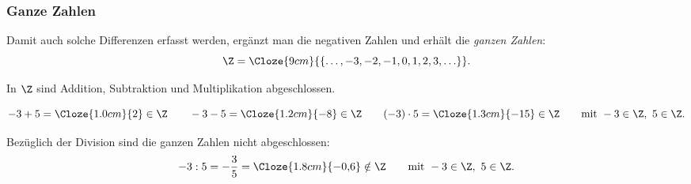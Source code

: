 \subsubsection{Ganze Zahlen}
\label{subsubsec:fundamentals_integer_numbers}

Damit auch solche Differenzen erfasst werden, ergänzt man die negativen Zahlen
und erhält die \emph{ganzen Zahlen}:
\[
  \Z=\Cloze{9cm}{\{\ldots,-3,-2,-1,0,1,2,3,\ldots\}}.
\]
\begin{center}
  \begingroup
    \def\NumberSetStage{2}
  \endgroup
\end{center}

In $\Z$ sind Addition, Subtraktion und Multiplikation abgeschlossen.

\[
  -3+5=\Cloze{1.0cm}{2}\in\Z
  \qquad
  -3-5=\Cloze{1.2cm}{-8}\in\Z
  \qquad
  (-3)\cdot5=\Cloze{1.3cm}{-15}\in\Z
  \qquad \text{mit } -3\in\Z,\ 5\in\Z.
\]

Bezüglich der Division sind die ganzen Zahlen nicht abgeschlossen:
\[
  -3:5=-\frac35=\Cloze{1.8cm}{-0{,}6}\notin\Z
  \qquad \text{mit } -3\in\Z,\ 5\in\Z.
\]

